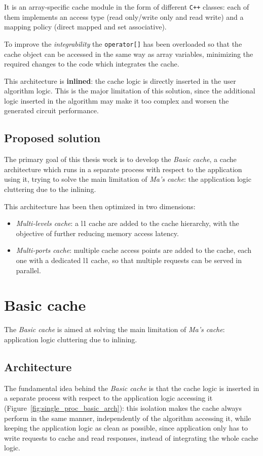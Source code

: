 \documentclass[11pt,a4paper,oneside]{memoir}
\begin{document}
It is an array-specific cache module in the form of different \texttt{C++}
classes: each of them implements an access type (read only/write only and read
write) and a mapping policy (direct mapped and set associative).

To improve the \emph{integrability} the \texttt{operator[]} has been overloaded
so that the cache object can be accessed in the same way as array variables,
minimizing the required changes to the code which integrates the cache.

\bigskip
This architecture is \textbf{inlined}: the cache logic is directly inserted in
the user algorithm logic.
This is the major limitation of this solution, since the additional logic
inserted in the algorithm may make it too complex and worsen the generated
circuit performance.

\section{Proposed solution}
The primary goal of this thesis work is to develop the \emph{Basic cache}, a
cache architecture which runs in a separate process with respect to the
application using it, trying to solve the main limitation of \emph{Ma's cache}:
the application logic cluttering due to the inlining.

This architecture has been then optimized in two dimensions:
\begin{itemize}
	\item \emph{Multi-levels cache}: a \ac{l1} cache are added to the cache
		hierarchy, with the objective of further reducing memory access
		latency.
	\item \emph{Multi-ports cache}: multiple cache access points are added
		to the cache, each one with a dedicated \ac{l1} cache, so that
		multiple requests can be served in parallel.
\end{itemize}

\chapter{Basic cache}
The \emph{Basic cache} is aimed at solving the main limitation of \emph{Ma's
cache}: application logic cluttering due to inlining.

\section{Architecture}
The fundamental idea behind the \emph{Basic cache} is that the cache logic is
inserted in a separate process with respect to the application logic accessing
it (Figure~\ref{fig:single_proc_basic_arch}): this isolation makes the cache
always perform in the same manner, independently of the algorithm accessing it,
while keeping the application logic as clean as possible, since application
only has to write requests to cache and read responses, instead of integrating
the whole cache logic.
\end{document}
